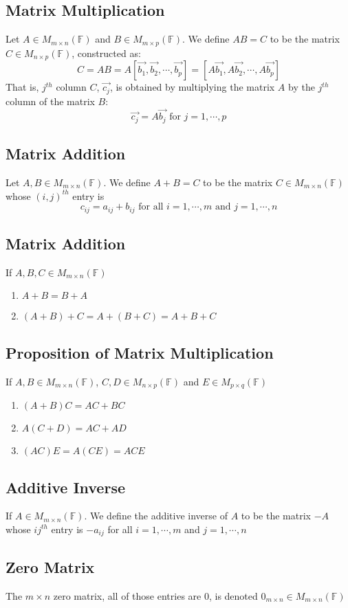 \documentclass[12pt, letterpaper]{article}
\begin{document}
\subsection{Matrix Multiplication}
Let $A\in M_{m\times n} (\mathbb{F})$ and $B\in M_{m\times p} (\mathbb{F})$. We define $AB = C$ to be the matrix $C\in M_{n\times p} (\mathbb{F})$, constructed as:
\[C = AB = A[\vec{b_1}, \vec{b_2}, \cdots, \vec{b_p}] = [A\vec{b_1}, A\vec{b_2}, \cdots, A\vec{b_p}]\]
That is, $j^{th}$ column $C$, $\vec{c_j}$, is obtained by multiplying the matrix $A$ by the $j^{th}$ column of the matrix $B$: 
\[\vec{c_j} = A\vec{b_j} \text{ for } j = 1, \cdots, p\]
\subsection{Matrix Addition}
Let $A,B\in M_{m\times n}(\mathbb{F})$. We define $A+B = C$ to be the matrix $C\in M_{m\times n}(\mathbb{F})$ whose $(i,j)^{th}$ entry is 
\[c_{ij} = a_{ij} + b_{ij} \text{ for all } i = 1, \cdots, m \text{ and } j = 1, \cdots, n\]
\subsection*{Matrix Addition}
If $A,B,C\in M_{m\times n}(\mathbb{F})$
\begin{enumerate}
    \item $A + B = B + A$
    \item $(A + B) + C = A + (B + C) = A + B + C$
\end{enumerate}
\subsection*{Proposition of Matrix Multiplication}
If $A,B\in M_{m\times n}(\mathbb{F})$, $C, D\in M_{n\times p}(\mathbb{F})$ and $E\in M_{p\times q}(\mathbb{F})$
\begin{enumerate}
    \item $(A+B)C = AC + BC$
    \item $A(C+D) = AC + AD$
    \item $(AC)E = A(CE) = ACE$
\end{enumerate}
\subsection{Additive Inverse}
If $A\in M_{m\times n}(\mathbb{F})$. We define the additive inverse of $A$ to be the matrix $-A$ whose $ij^{th}$ entry is $-a_{ij}$ for all $i = 1, \cdots, m$ and $j = 1, \cdots, n$
\subsection{Zero Matrix}
The $m\times n$ zero matrix, all of those entries are 0, is denoted $0_{m\times n}\in M_{m\times n}(\mathbb{F})$
\end{document}
